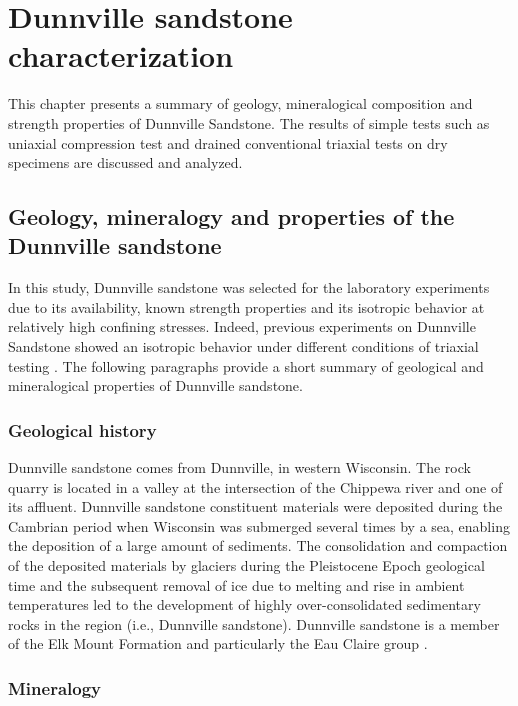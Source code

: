 \chapter{Dunnville sandstone characterization}\label{ch3:title}


This chapter presents a summary of geology, mineralogical composition and strength properties of Dunnville Sandstone. The results of simple tests such as uniaxial compression test and drained conventional triaxial tests on dry specimens are discussed and analyzed.

\section{Geology, mineralogy and properties of the Dunnville sandstone}

In this study, Dunnville sandstone was selected for the laboratory experiments due to its availability, known strength properties and its isotropic behavior at relatively high confining stresses. Indeed, previous experiments on Dunnville Sandstone showed an isotropic behavior under different conditions of triaxial testing \cite{Tarokh2016}. The following paragraphs provide a short summary of geological and mineralogical properties of Dunnville sandstone.

\subsection{Geological history}

Dunnville sandstone comes from Dunnville, in western Wisconsin. The rock quarry is located in a valley at the intersection of the Chippewa river and one of its affluent. Dunnville sandstone constituent materials were deposited during the Cambrian period when Wisconsin was submerged several times by a sea, enabling the deposition of a large amount of sediments. The consolidation and compaction of the deposited materials by glaciers during the Pleistocene Epoch geological time and the subsequent removal of ice due to melting and rise in ambient temperatures led to the development of highly over-consolidated sedimentary rocks in the region (i.e., Dunnville sandstone). Dunnville sandstone is a member of the Elk Mount Formation and particularly the Eau Claire group \cite{Ostrom1966}.

\subsection{Mineralogy}

